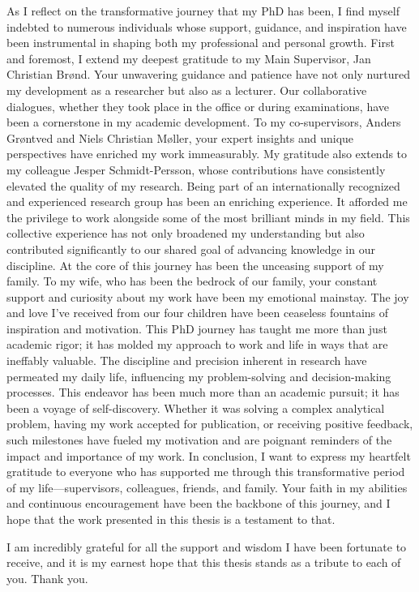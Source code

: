 \documentclass[
  9pt,
]{scrbook}
\begin{document}
As I reflect on the transformative journey that my PhD has been, I find myself indebted to numerous individuals whose support, guidance, and inspiration have been instrumental in shaping both my professional and personal growth.
First and foremost, I extend my deepest gratitude to my Main Supervisor, Jan Christian Brønd. Your unwavering guidance and patience have not only nurtured my development as a researcher but also as a lecturer. Our collaborative dialogues, whether they took place in the office or during examinations, have been a cornerstone in my academic development.
To my co-supervisors, Anders Grøntved and Niels Christian Møller, your expert insights and unique perspectives have enriched my work immeasurably. My gratitude also extends to my colleague Jesper Schmidt-Persson, whose contributions have consistently elevated the quality of my research.
Being part of an internationally recognized and experienced research group has been an enriching experience. It afforded me the privilege to work alongside some of the most brilliant minds in my field. This collective experience has not only broadened my understanding but also contributed significantly to our shared goal of advancing knowledge in our discipline.
At the core of this journey has been the unceasing support of my family. To my wife, who has been the bedrock of our family, your constant support and curiosity about my work have been my emotional mainstay. The joy and love I've received from our four children have been ceaseless fountains of inspiration and motivation.
This PhD journey has taught me more than just academic rigor; it has molded my approach to work and life in ways that are ineffably valuable. The discipline and precision inherent in research have permeated my daily life, influencing my problem-solving and decision-making processes. This endeavor has been much more than an academic pursuit; it has been a voyage of self-discovery.
Whether it was solving a complex analytical problem, having my work accepted for publication, or receiving positive feedback, such milestones have fueled my motivation and are poignant reminders of the impact and importance of my work.
In conclusion, I want to express my heartfelt gratitude to everyone who has supported me through this transformative period of my life—supervisors, colleagues, friends, and family. Your faith in my abilities and continuous encouragement have been the backbone of this journey, and I hope that the work presented in this thesis is a testament to that.

I am incredibly grateful for all the support and wisdom I have been fortunate to receive, and it is my earnest hope that this thesis stands as a tribute to each of you. Thank you.
\end{document}
